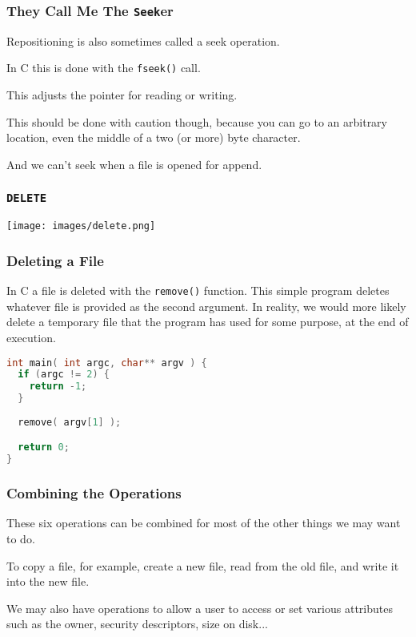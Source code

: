 \begin{frame}
	\frametitle{They Call Me The \texttt{Seek}er}

	Repositioning is also sometimes called a seek operation.

	In C this is done with the \texttt{fseek()} call.

	This adjusts the pointer for reading or writing.

	This should be done with caution though, because you can go to an arbitrary location, even the middle of a two (or more) byte character.

	And we can't seek when a file is opened for append.

\end{frame}


\begin{frame}
	\frametitle{\texttt{DELETE}}

	\begin{center}
		\texttt{[image: images/delete.png]}
	\end{center}

\end{frame}


\begin{frame}[fragile]
	\frametitle{Deleting a File}

	In C a file is deleted with the \texttt{remove()} function. This simple program deletes whatever file is provided as the second argument. In reality, we would more likely delete a temporary file that the program has used for some purpose, at the end of execution.

	\begin{lstlisting}[language=C]
int main( int argc, char** argv ) {
  if (argc != 2) {
    return -1;
  }
  
  remove( argv[1] );

  return 0;
}    
\end{lstlisting}

\end{frame}




\begin{frame}
	\frametitle{Combining the Operations}

	These six operations can be combined for most of the other things we may want to do.

	To copy a file, for example, create a new file, read from the old file, and write it into the new file.

	We may also have operations to allow a user to access or set various attributes such as the owner, security descriptors, size on disk...

\end{frame}

